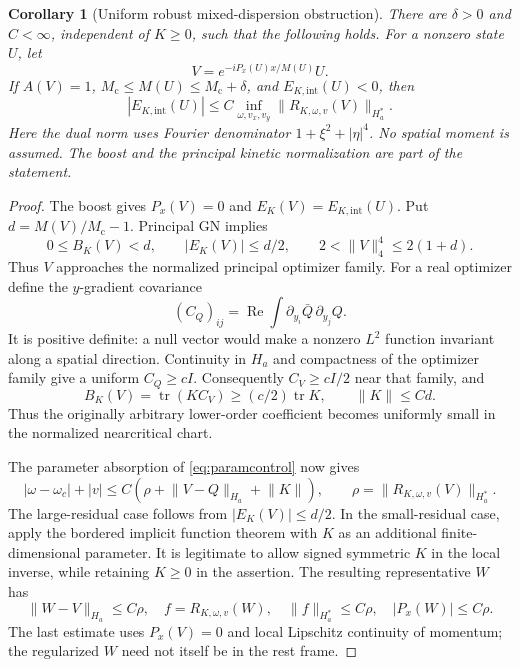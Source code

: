 \documentclass[11pt]{article}
\newtheorem{corollary}[theorem]{Corollary}
\theoremstyle{definition}
\theoremstyle{remark}
\DeclareMathOperator{\Rea}{Re}
\newcommand{\norm}[1]{\lVert #1\rVert}
\newcommand{\mc}{M_{\mathrm c}}
\begin{document}
\begin{corollary}[Uniform robust mixed-dispersion obstruction]\label{cor:robustmixed}
There are $\delta>0$ and $C<\infty$, independent of $K\ge0$, such that the following holds. For a nonzero state $U$, let
\[
 V=e^{-iP_x(U)x/M(U)}U.
\]
If $A(V)=1$, $\mc\le M(U)\le\mc+\delta$, and $E_{K,\mathrm{int}}(U)<0$, then
\begin{equation}\label{eq:robustmixed}
 |E_{K,\mathrm{int}}(U)|\le
 C\inf_{\omega,v_x,v_y}\norm{R_{K,\omega,v}(V)}_{H_a^*}.
\end{equation}
Here the dual norm uses Fourier denominator $1+\xi^2+|\eta|^4$. No spatial moment is assumed. The boost and the principal kinetic normalization are part of the statement.
\end{corollary}
\begin{proof}
The boost gives $P_x(V)=0$ and $E_K(V)=E_{K,\mathrm{int}}(U)$. Put $d=M(V)/\mc-1$. Principal GN implies
\[
 0\le B_K(V)<d,\qquad |E_K(V)|\le d/2,
 \qquad 2<\norm V_4^4\le2(1+d).
\]
Thus $V$ approaches the normalized principal optimizer family. For a real optimizer define the $y$-gradient covariance
\[
 (C_Q)_{ij}=\Rea\int\partial_{y_i}\bar Q\,\partial_{y_j}Q.
\]
It is positive definite: a null vector would make a nonzero $L^2$ function invariant along a spatial direction. Continuity in $H_a$ and compactness of the optimizer family give a uniform $C_Q\ge cI$. Consequently $C_V\ge cI/2$ near that family, and
\begin{equation}\label{eq:Ksmall}
 B_K(V)=\operatorname{tr}(KC_V)\ge(c/2)\operatorname{tr}K,
 \qquad \norm K\le Cd.
\end{equation}
Thus the originally arbitrary lower-order coefficient becomes uniformly small in the normalized nearcritical chart.

The parameter absorption of \eqref{eq:paramcontrol} now gives
\[
 |\omega-\omega_c|+|v|\le C(\rho+\norm{V-Q}_{H_a}+\norm K),
 \qquad \rho=\norm{R_{K,\omega,v}(V)}_{H_a^*}.
\]
The large-residual case follows from $|E_K(V)|\le d/2$. In the small-residual case, apply the bordered implicit function theorem with $K$ as an additional finite-dimensional parameter. It is legitimate to allow signed symmetric $K$ in the local inverse, while retaining $K\ge0$ in the assertion. The resulting representative $W$ has
\[
 \norm{W-V}_{H_a}\le C\rho,\quad f=R_{K,\omega,v}(W),
 \quad\norm f_{H_a^*}\le C\rho,\quad |P_x(W)|\le C\rho.
\]
The last estimate uses $P_x(V)=0$ and local Lipschitz continuity of momentum; the regularized $W$ need not itself be in the rest frame.


\end{proof}
\end{document}
